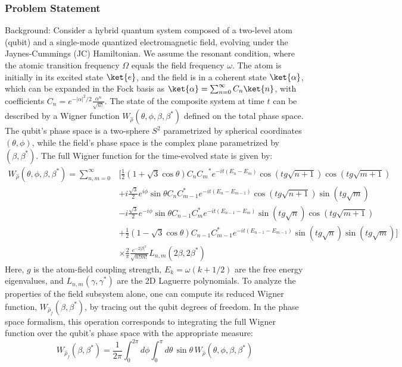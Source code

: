 \documentclass[10pt]{article}
\begin{document}
\subsubsection*{Problem Statement}
Background:
Consider a hybrid quantum system composed of a two-level atom (qubit) and a single-mode quantized electromagnetic field, evolving under the Jaynes-Cummings (JC) Hamiltonian. We assume the resonant condition, where the atomic transition frequency $\Omega$ equals the field frequency $\omega$. The atom is initially in its excited state $\ket{e}$, and the field is in a coherent state $\ket{\alpha}$, which can be expanded in the Fock basis as $\ket{\alpha} = \sum_{n=0}^{\infty} C_n \ket{n}$, with coefficients $C_n = e^{-|\alpha|^2/2} \frac{\alpha^n}{\sqrt{n!}}$. The state of the composite system at time $t$ can be described by a Wigner function $W_{\hat{\rho}}(\theta, \phi, \beta, \beta^*)$ defined on the total phase space. The qubit's phase space is a two-sphere $S^2$ parametrized by spherical coordinates $(\theta, \phi)$, while the field's phase space is the complex plane parametrized by $(\beta, \beta^*)$. The full Wigner function for the time-evolved state is given by:
\begin{align*}
W_{\hat{\rho}}(\theta, \phi, \beta,\beta^{*}) = \sum_{n,m=0}^{\infty} & \Big[\frac{1}{2}(1+\sqrt{3}\cos\theta) C_n{C_m}^{*} {e^{-it(E_n-E_m)}}\cos(tg\sqrt{n+1})\cos(tg\sqrt{m+1}) \\
& +i\frac{\sqrt{3}}{2}e^{i\phi}\sin\theta C_n C_{m-1}^{*}{e^{-it(E_n-E_{m-1})}}\cos(tg\sqrt{n+1})\sin(tg\sqrt{m}) \\
& -i\frac{\sqrt{3}}{2}e^{-i\phi}\sin\theta C_{n-1}C_m^{*} {e^{-it(E_{n-1}-E_m)}}\sin(tg\sqrt{n})\cos(tg\sqrt{m+1}) \\
& +\frac{1}{2}(1-\sqrt{3}\cos\theta) C_{n-1}C_{m-1}^{*} {e^{-it(E_{n-1}-E_{m-1})}}\sin(tg\sqrt{n})\sin(tg\sqrt{m})\Big] \\
& \times \frac{2}{\pi}\frac{e^{-2|\beta|^{2}}}{\sqrt{n!m!}}L_{n,m}(2\beta,2\beta^{*})
\end{align*}
Here, $g$ is the atom-field coupling strength, $E_k = \omega(k+1/2)$ are the free energy eigenvalues, and $L_{n,m}(\gamma, \gamma^*)$ are the 2D Laguerre polynomials. To analyze the properties of the field subsystem alone, one can compute its reduced Wigner function, $W_{\hat{\rho}_f}(\beta, \beta^*)$, by tracing out the qubit degrees of freedom. In the phase space formalism, this operation corresponds to integrating the full Wigner function over the qubit's phase space with the appropriate measure:
$$W_{\hat{\rho}_{f}}(\beta,\beta^{*})=\frac{1}{2\pi}\int_{0}^{2\pi} d\phi \int_{0}^{\pi} d\theta \, \sin\theta \, W_{\hat{\rho}}(\theta,\phi,\beta,\beta^{*})$$
\end{document}
